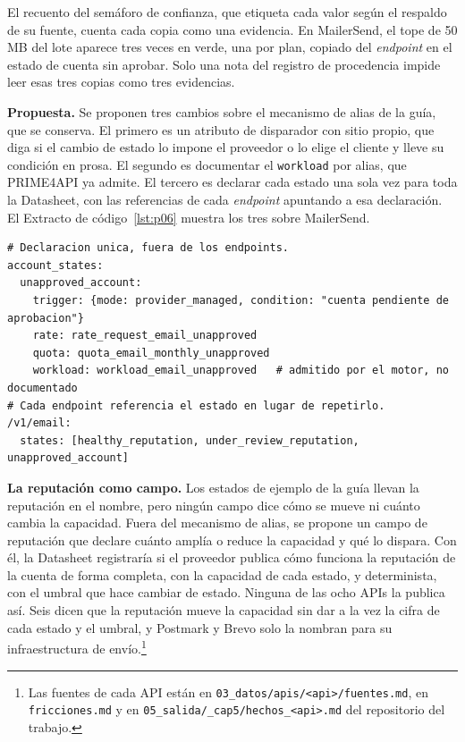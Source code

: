 El recuento del semáforo de confianza, que etiqueta cada valor según el respaldo de su fuente, cuenta cada copia como una evidencia.
En MailerSend, el tope de 50 MB del lote aparece tres veces en verde, una por plan, copiado del \textit{endpoint} en el estado de cuenta sin aprobar.
Solo una nota del registro de procedencia impide leer esas tres copias como tres evidencias.

\textbf{Propuesta.} Se proponen tres cambios sobre el mecanismo de alias de la guía, que se conserva.
El primero es un atributo de disparador con sitio propio, que diga si el cambio de estado lo impone el proveedor o lo elige el cliente y lleve su condición en prosa.
El segundo es documentar el \texttt{workload} por alias, que PRIME4API ya admite.
El tercero es declarar cada estado una sola vez para toda la Datasheet, con las referencias de cada \textit{endpoint} apuntando a esa declaración.
El Extracto de código~\ref{lst:p06} muestra los tres sobre MailerSend.

\begin{lstlisting}[style=datasheetyaml,caption={P-06: estados de la suscripción y de la reputación declarados una vez, con su disparador y con el \texttt{workload} que la guía no documenta (caso MailerSend).},label={lst:p06}]
# Declaracion unica, fuera de los endpoints.
account_states:
  unapproved_account:
    trigger: {mode: provider_managed, condition: "cuenta pendiente de aprobacion"}
    rate: rate_request_email_unapproved
    quota: quota_email_monthly_unapproved
    workload: workload_email_unapproved   # admitido por el motor, no documentado
# Cada endpoint referencia el estado en lugar de repetirlo.
/v1/email:
  states: [healthy_reputation, under_review_reputation, unapproved_account]
\end{lstlisting}

\textbf{La reputación como campo.} Los estados de ejemplo de la guía llevan la reputación en el nombre, pero ningún campo dice cómo se mueve ni cuánto cambia la capacidad.
Fuera del mecanismo de alias, se propone un campo de reputación que declare cuánto amplía o reduce la capacidad y qué lo dispara.
Con él, la Datasheet registraría si el proveedor publica cómo funciona la reputación de la cuenta de forma completa, con la capacidad de cada estado, y determinista, con el umbral que hace cambiar de estado.
Ninguna de las ocho APIs la publica así.
Seis dicen que la reputación mueve la capacidad sin dar a la vez la cifra de cada estado y el umbral, y Postmark y Brevo solo la nombran para su infraestructura de envío.\footnote{Las fuentes de cada API están en \texttt{03\_datos/\allowbreak apis/\allowbreak <api>/\allowbreak fuentes.md}, en \texttt{fricciones.md} y en \texttt{05\_salida/\allowbreak \_cap5/\allowbreak hechos\_<api>.md} del repositorio del trabajo.}

